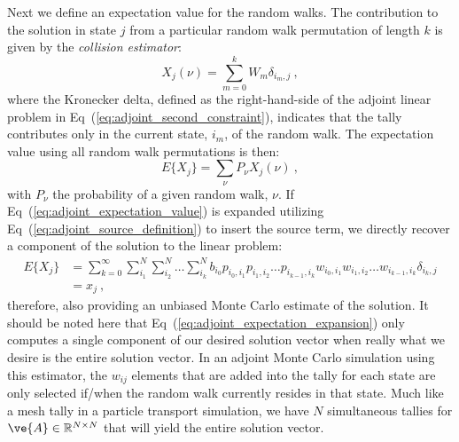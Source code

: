 \documentclass[letterpaper,11pt]{article}
\begin{document}
Next we define an expectation value for the random walks. The
contribution to the solution in state $j$ from a particular random
walk permutation of length $k$ is given by the \textit{collision
  estimator}:
\begin{equation}
  X_{j}(\nu) = \sum_{m=0}^k W_{m} \delta_{i_m,j}\:,
  \label{eq:adjoint_permutation_contribution}
\end{equation}
where the Kronecker delta, defined as the right-hand-side of the
adjoint linear problem in Eq~(\ref{eq:adjoint_second_constraint}),
indicates that the tally contributes only in the current state, $i_m$,
of the random walk. The expectation value using all random walk
permutations is then:
\begin{equation}
  E\{X_j\} = \sum_{\nu} P_{\nu} X_{j}(\nu)\:,
  \label{eq:adjoint_expectation_value}
\end{equation}
with $P_{\nu}$ the probability of a given random walk, $\nu$.  If
Eq~(\ref{eq:adjoint_expectation_value}) is expanded utilizing
Eq~(\ref{eq:adjoint_source_definition}) to insert the source term, we
directly recover a component of the solution to the linear problem:
\begin{equation}
  \begin{split}
    E\{X_j\} &=\sum_{k=0}^{\infty}\sum_{i_1}^{N}\sum_{i_2}^{N}\ldots
    \sum_{i_k}^{N} b_{i_0} p_{i_0,i_1}p_{i_1,i_2}\ldots
    p_{i_{k-1},i_k} w_{i_0,i_1}w_{i_1,i_2}\ldots
    w_{i_{k-1},i_k} \delta_{i_k,j} \\ &= x_{j}\:,
  \end{split}
  \label{eq:adjoint_expectation_expansion}
\end{equation}
therefore, also providing an unbiased Monte Carlo estimate of the
solution. It should be noted here that
Eq~(\ref{eq:adjoint_expectation_expansion}) only computes a single
component of our desired solution vector when really what we desire is
the entire solution vector. In an adjoint Monte Carlo simulation using
this estimator, the $w_{ij}$ elements that are added into the tally
for each state are only selected if/when the random walk currently
resides in that state. Much like a mesh tally in a particle transport
simulation, we have $N$ simultaneous tallies for $\ve{A} \in
\mathbb{R}^{N \times N}$ that will yield the entire solution vector.
\end{document}
